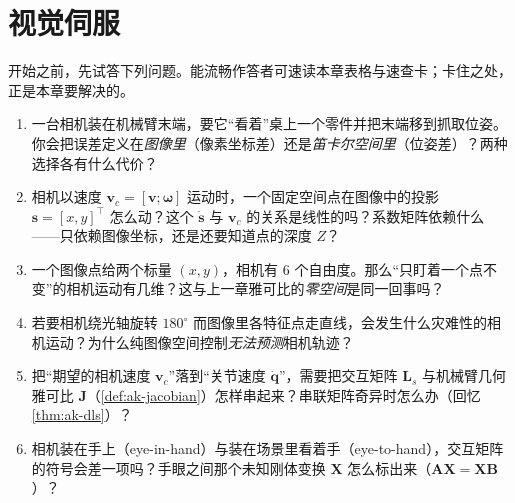 \chapter{视觉伺服}
\label{ch:visual-servoing}


\begin{practice}[前置自测]
开始之前，先试答下列问题。能流畅作答者可速读本章表格与速查卡；卡住之处，正是本章要解决的。
\begin{enumerate}
  \item 一台相机装在机械臂末端，要它“看着”桌上一个零件并把末端移到抓取位姿。你会把误差定义在\emph{图像里}（像素坐标差）还是\emph{笛卡尔空间里}（位姿差）？两种选择各有什么代价？
  \item 相机以速度 $\mathbf{v}_c=[\mathbf{v};\boldsymbol{\omega}]$ 运动时，一个固定空间点在图像中的投影 $\mathbf{s}=[x,y]^\top$ 怎么动？这个 $\dot{\mathbf{s}}$ 与 $\mathbf{v}_c$ 的关系是线性的吗？系数矩阵依赖什么——只依赖图像坐标，还是还要知道点的深度 $Z$？
  \item 一个图像点给两个标量 $(x,y)$，相机有 $6$ 个自由度。那么“只盯着一个点不变”的相机运动有几维？这与上一章雅可比的\emph{零空间}是同一回事吗？
  \item 若要相机绕光轴旋转 $180^\circ$ 而图像里各特征点走直线，会发生什么灾难性的相机运动？为什么纯图像空间控制\emph{无法预测}相机轨迹？
  \item 把“期望的相机速度 $\mathbf{v}_c$”落到“关节速度 $\dot{\mathbf{q}}$”，需要把交互矩阵 $\mathbf{L}_s$ 与机械臂几何雅可比 $\mathbf{J}$（\cref{def:ak-jacobian}）怎样串起来？串联矩阵奇异时怎么办（回忆 \cref{thm:ak-dls}）？
  \item 相机装在手上（eye-in-hand）与装在场景里看着手（eye-to-hand），交互矩阵的符号会差一项吗？手眼之间那个未知刚体变换 $\mathbf{X}$ 怎么标出来（$\mathbf{A}\mathbf{X}=\mathbf{X}\mathbf{B}$）？
\end{enumerate}
\end{practice}

